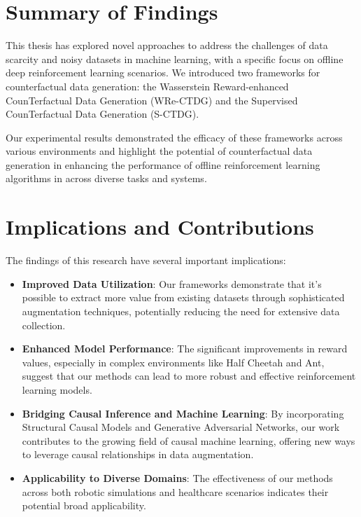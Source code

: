 \section{Summary of Findings}

This thesis has explored novel approaches to address the challenges
of data scarcity and noisy datasets in machine learning, with a specific
focus on offline deep reinforcement learning scenarios.
We introduced two frameworks for counterfactual data generation:
the Wasserstein Reward-enhanced CounTerfactual Data Generation (WRe-CTDG)
and the Supervised CounTerfactual Data Generation (S-CTDG).

Our experimental results demonstrated the efficacy of these
frameworks across various environments and highlight the potential
of counterfactual data generation in enhancing the performance of
offline reinforcement learning algorithms
in across diverse tasks and systems.

\section{Implications and Contributions}

The findings of this research have several important implications:
\begin{itemize}
    \item \textbf{Improved Data Utilization}: Our frameworks demonstrate
    that it's possible to extract more value from existing datasets
    through sophisticated augmentation techniques, potentially 
    reducing the need for extensive data collection.
    \item \textbf{Enhanced Model Performance}: The significant improvements
    in reward values, especially in complex environments
    like Half Cheetah and Ant, suggest that our methods can lead
    to more robust and effective reinforcement learning models.
    \item \textbf{Bridging Causal Inference and Machine Learning}:
    By incorporating Structural Causal Models and
    Generative Adversarial Networks, our work contributes to the
    growing field of causal machine learning, offering new ways to
    leverage causal relationships in data augmentation.
    \item \textbf{Applicability to Diverse Domains}: The effectiveness of
    our methods across both robotic simulations and healthcare
    scenarios indicates their potential broad applicability.
\end{itemize}

